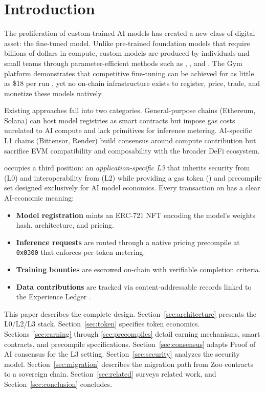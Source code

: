 \section{Introduction}


The proliferation of custom-trained AI models has created a new class of digital asset: the fine-tuned model. Unlike pre-trained foundation models that require billions of dollars in compute, custom models are produced by individuals and small teams through parameter-efficient methods such as \LoRA{} \cite{hu2021lora}, \QLoRA{} \cite{dettmers2023qlora}, and \GRPO{} \cite{shao2024deepseekmath}. The Gym platform demonstrates that competitive fine-tuning can be achieved for as little as \$18 per run \cite{zoo-gym}, yet no on-chain infrastructure exists to register, price, trade, and monetize these models natively.

Existing approaches fall into two categories. General-purpose chains (Ethereum, Solana) can host model registries as smart contracts but impose gas costs unrelated to AI compute and lack primitives for inference metering. AI-specific L1 chains (Bittensor, Render) build consensus around compute contribution but sacrifice EVM compatibility and composability with the broader DeFi ecosystem.

\Beluga{} occupies a third position: an \emph{application-specific L3} that inherits security from \Lux{} (L0) and interoperability from \Zoo{} (L2) while providing a gas token (\BLG{}) and precompile set designed exclusively for AI model economics. Every transaction on \Beluga{} has a clear AI-economic meaning:

\begin{itemize}[nosep]
    \item \textbf{Model registration} mints an ERC-721 NFT encoding the model's weights hash, architecture, and pricing.
    \item \textbf{Inference requests} are routed through a native pricing precompile at \texttt{0x0300} that enforces per-token metering.
    \item \textbf{Training bounties} are escrowed on-chain with verifiable completion criteria.
    \item \textbf{Data contributions} are tracked via content-addressable records linked to the Experience Ledger \cite{zoo-experience-ledger}.
\end{itemize}

This paper describes the complete design. Section~\ref{sec:architecture} presents the L0/L2/L3 stack. Section~\ref{sec:token} specifies \BLG{} token economics. Sections~\ref{sec:earning} through \ref{sec:precompiles} detail earning mechanisms, smart contracts, and precompile specifications. Section~\ref{sec:consensus} adapts Proof of AI consensus for the L3 setting. Section~\ref{sec:security} analyzes the security model. Section~\ref{sec:migration} describes the migration path from Zoo contracts to a sovereign chain. Section~\ref{sec:related} surveys related work, and Section~\ref{sec:conclusion} concludes.

